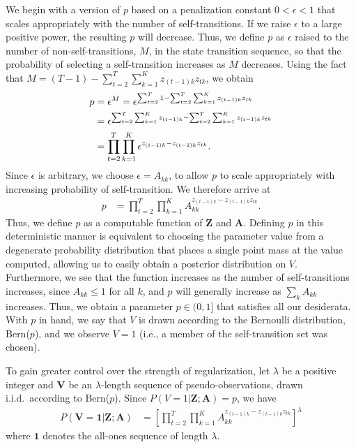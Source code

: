 \documentclass[letterpaper]{article}
\begin{document}
We begin with a version of $p$ based on a penalization constant $0 < \epsilon <
1$ that scales appropriately with the number of self-transitions. If we raise
$\epsilon$ to a large positive power, the resulting $p$ will decrease. Thus, we
define $p$ as $\epsilon$ raised to the number of non-self-transitions, $M$, in
the state transition sequence, so that the probability of selecting a
self-transition increases as $M$ decreases. Using the fact that $M=(T-1) - \sum^{T}_{t=2}\sum^{K}_{k=1}z_{(t-1)k}z_{tk}$, we obtain
\begin{align}
    p &= \epsilon^M = \epsilon^{\sum^{T}_{t=2}1 -
    \sum^{T}_{t=2}\sum^{K}_{k=1}z_{(t-1)k}z_{tk}} \notag\\
      &= \epsilon^{\sum^{T}_{t=2}\sum^{K}_{k=1}z_{(t-1)k} - \sum^{T}_{t=2}\sum^{K}_{k=1}z_{(t-1)k}z_{tk}} \notag\\
      &= \prod^{T}_{t=2}\prod_{k=1}^{K}\epsilon^{z_{(t-1)k} - z_{(t-1)k}z_{tk}}. \label{eq:eps-0}
\end{align}
Since $\epsilon$ is arbitrary, we choose $\epsilon = A_{kk}$, to allow $p$ to scale appropriately with increasing probability of self-transition. We therefore arrive at
\begin{align*}
    p &= \prod^{T}_{t=2}\prod^{K}_{k=1}A_{kk}^{z_{(t-1)k} - z_{(t-1)k}z_{tk}}.
\end{align*}
Thus, we define $p$ as a computable function of $\mathbf{Z}$ and $\mathbf{A}$.
Defining $p$ in this deterministic manner is equivalent to choosing the
parameter value from a degenerate probability distribution that places a single
point mass at the value computed, allowing us to easily obtain a posterior
distribution on $V$. Furthermore, we see that the function increases as the
number of self-transitions increases, since $A_{kk} \leq 1$ for all $k$, and $p$
will generally increase as $\sum_k A_{kk}$ increases. Thus, we obtain a
parameter $p \in (0,1]$ that satisfies all our desiderata.
With $p$ in hand, we say that $V$ is drawn according to the Bernoulli
distribution, Bern($p$), and we observe $V = 1$ (i.e., a member of the
self-transition set was chosen). 

To gain greater control over the strength of regularization, let $\lambda$ be a
positive integer and $\mathbf{V}$ be an $\lambda$-length sequence of
pseudo-observations, drawn i.i.d.\ according to Bern($p$). Since $P(V =
1|\mathbf{Z};\mathbf{A}) = p$, we have
\begin{align*}
    P(\mathbf{V} = \mathbf{1}|\mathbf{Z}; \mathbf{A}) &= \left[\prod^{T}_{t=2}\prod^{K}_{k=1}A_{kk}^{z_{(t-1)k} - z_{(t-1)k}z_{tk}}\right]^\lambda
\end{align*}
where $\mathbf{1}$ denotes the all-ones sequence of length $\lambda$.
\end{document}
